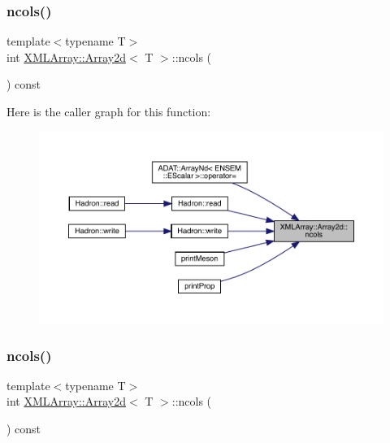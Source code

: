 \subsubsection{\texorpdfstring{ncols()}{ncols()}\hspace{0.1cm}{\footnotesize\ttfamily [1/2]}}
{\footnotesize\ttfamily template$<$typename T$>$ \\
int \mbox{\hyperlink{classXMLArray_1_1Array2d}{X\+M\+L\+Array\+::\+Array2d}}$<$ T $>$\+::ncols (\begin{DoxyParamCaption}{ }\end{DoxyParamCaption}) const\hspace{0.3cm}{\ttfamily [inline]}}

Here is the caller graph for this function\+:\nopagebreak
\begin{figure}[H]
\begin{center}
\leavevmode
\includegraphics[width=350pt]{dc/ddc/classXMLArray_1_1Array2d_a9eecadb91fe97638a8d7adce77b0a562_icgraph}
\end{center}
\end{figure}
\mbox{\label{classXMLArray_1_1Array2d_a9eecadb91fe97638a8d7adce77b0a562}} 
\subsubsection{\texorpdfstring{ncols()}{ncols()}\hspace{0.1cm}{\footnotesize\ttfamily [2/2]}}
{\footnotesize\ttfamily template$<$typename T$>$ \\
int \mbox{\hyperlink{classXMLArray_1_1Array2d}{X\+M\+L\+Array\+::\+Array2d}}$<$ T $>$\+::ncols (\begin{DoxyParamCaption}{ }\end{DoxyParamCaption}) const\hspace{0.3cm}{\ttfamily [inline]}}

